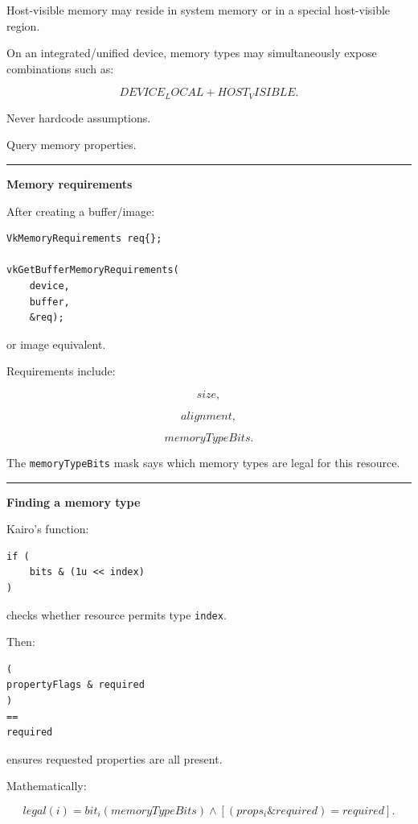 Host-visible memory may reside in system memory or in a special host-visible region.

On an integrated/unified device, memory types may simultaneously expose combinations such as:

\[
DEVICE_LOCAL
+
HOST_VISIBLE.
\]

Never hardcode assumptions.

Query memory properties.

\begin{center}\rule{0.5\linewidth}{0.5pt}\end{center}

\textbf{Memory requirements}

After creating a buffer/image:

\begin{verbatim}
VkMemoryRequirements req{};

vkGetBufferMemoryRequirements(
    device,
    buffer,
    &req);
\end{verbatim}

or image equivalent.

Requirements include:

\[
size,
\]

\[
alignment,
\]

\[
memoryTypeBits.
\]

The \texttt{memoryTypeBits} mask says which memory types are legal for this resource.

\begin{center}\rule{0.5\linewidth}{0.5pt}\end{center}

\textbf{Finding a memory type}

Kairo's function:

\begin{verbatim}
if (
    bits & (1u << index)
)
\end{verbatim}

checks whether resource permits type \texttt{index}.

Then:

\begin{verbatim}
(
propertyFlags & required
)
==
required
\end{verbatim}

ensures requested properties are all present.

Mathematically:

\[
\boxed{
legal(i)
=
bit_i(memoryTypeBits)
\land
[(props_i\&required)=required].
}
\]

